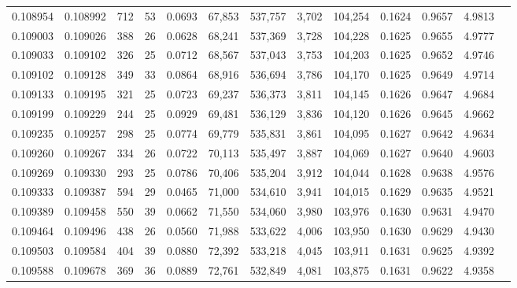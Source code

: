 \begin{tabular}{rrrrrrrrrrrrr}
0.108954 & 0.108992 &   712 &  53 &                                     0.0693 &  67,853 & 537,757 &   3,702 & 104,254 & 0.1624 & 0.9657 & 4.9813 \\
0.109003 & 0.109026 &   388 &  26 &                                     0.0628 &  68,241 & 537,369 &   3,728 & 104,228 & 0.1625 & 0.9655 & 4.9777 \\
0.109033 & 0.109102 &   326 &  25 &                                     0.0712 &  68,567 & 537,043 &   3,753 & 104,203 & 0.1625 & 0.9652 & 4.9746 \\
0.109102 & 0.109128 &   349 &  33 &                                     0.0864 &  68,916 & 536,694 &   3,786 & 104,170 & 0.1625 & 0.9649 & 4.9714 \\
0.109133 & 0.109195 &   321 &  25 &                                     0.0723 &  69,237 & 536,373 &   3,811 & 104,145 & 0.1626 & 0.9647 & 4.9684 \\
0.109199 & 0.109229 &   244 &  25 &                                     0.0929 &  69,481 & 536,129 &   3,836 & 104,120 & 0.1626 & 0.9645 & 4.9662 \\
0.109235 & 0.109257 &   298 &  25 &                                     0.0774 &  69,779 & 535,831 &   3,861 & 104,095 & 0.1627 & 0.9642 & 4.9634 \\
0.109260 & 0.109267 &   334 &  26 &                                     0.0722 &  70,113 & 535,497 &   3,887 & 104,069 & 0.1627 & 0.9640 & 4.9603 \\
0.109269 & 0.109330 &   293 &  25 &                                     0.0786 &  70,406 & 535,204 &   3,912 & 104,044 & 0.1628 & 0.9638 & 4.9576 \\
0.109333 & 0.109387 &   594 &  29 &                                     0.0465 &  71,000 & 534,610 &   3,941 & 104,015 & 0.1629 & 0.9635 & 4.9521 \\
0.109389 & 0.109458 &   550 &  39 &                                     0.0662 &  71,550 & 534,060 &   3,980 & 103,976 & 0.1630 & 0.9631 & 4.9470 \\
0.109464 & 0.109496 &   438 &  26 &                                     0.0560 &  71,988 & 533,622 &   4,006 & 103,950 & 0.1630 & 0.9629 & 4.9430 \\
0.109503 & 0.109584 &   404 &  39 &                                     0.0880 &  72,392 & 533,218 &   4,045 & 103,911 & 0.1631 & 0.9625 & 4.9392 \\
0.109588 & 0.109678 &   369 &  36 &                                     0.0889 &  72,761 & 532,849 &   4,081 & 103,875 & 0.1631 & 0.9622 & 4.9358 \\

\end{tabular}
